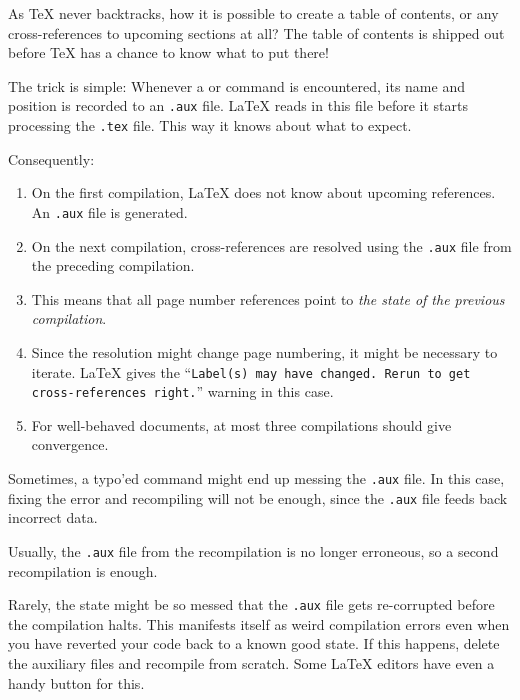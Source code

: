As \TeX{} never backtracks,
how it is possible to create a table of contents,
or any cross-references to upcoming sections at all?
The table of contents is shipped out before \TeX{} has a chance to know what to put there!

The trick is simple:
Whenever a  or  command is encountered,
its name and position is recorded to an \verb|.aux| file.
\LaTeX{} reads in this file before it starts processing the \verb|.tex| file.
This way it knows about what to expect.

Consequently:
\begin{enumerate}
\item On the first compilation, \LaTeX{} does not know about upcoming references.
    An \verb|.aux| file is generated.
\item On the next compilation, cross-references are resolved
    using the \verb|.aux| file from the preceding compilation.
\item This means that all page number references point to \emph{the state of the previous compilation}.
\item Since the resolution might change page numbering,
    it might be necessary to iterate.
    \LaTeX{} gives the
    ``\texttt{Label(s) may have changed. Rerun to get cross-references right.}''
    warning in this case.
\item For well-behaved documents, at most three compilations should give convergence.
\end{enumerate}

\begin{warning}
Sometimes, a typo'ed command might end up messing the \verb|.aux| file.
In this case, fixing the error and recompiling will not be enough,
since the \verb|.aux| file feeds back incorrect data.

Usually, the \verb|.aux| file from the recompilation is no longer erroneous,
so a second recompilation is enough.

Rarely, the state might be so messed that the \verb|.aux| file gets re-corrupted
before the compilation halts.
This manifests itself as weird compilation errors even
when you have reverted your code back to a known good state.
If this happens, delete the auxiliary files and recompile from scratch.
Some \LaTeX{} editors have even a handy button for this.
\end{warning}

